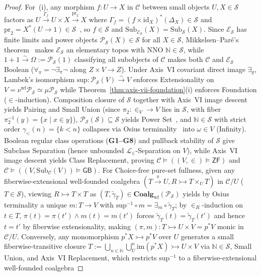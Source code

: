 \begin{proof}
For~(i), any morphism $f : U \to X$ in $\mathcal{C}$ between small objects $U, X \in \mathcal{S}$ factors as $U \xrightarrow{\Gamma_f} U \times X \xrightarrow{\mathrm{pr}_2} X$ where $\Gamma_f = (f \times \mathrm{id}_X)^*(\Delta_X) \in \mathcal{S}$ and $\mathrm{pr}_2 = X^*(U \to 1) \in \mathcal{S}$~\cite[Lemma~I.1.2]{JoyalMoerdijk95}, so $f \in \mathcal{S}$ and $\mathrm{Sub}_{\mathcal{E}_{\mathcal{S}}}(X) = \mathrm{Sub}_{\mathcal{S}}(X)$. Since $\mathcal{E}_{\mathcal{S}}$ has finite limits and power objects $\mathcal{P}_{\mathcal{S}}(X) \in \mathcal{S}$ for all $X \in \mathcal{S}$, Mikkelsen--Par\'e's theorem~\cite[Thm.~A2.2.3 \& Cor.~A2.2.4]{Johnstone02} makes $\mathcal{E}_{\mathcal{S}}$ an elementary topos with $\mathrm{NNO}$ $\mathbb{N} \in \mathcal{S}$, while $1 + 1 \xrightarrow{\sim} \Omega := \mathcal{P}_{\mathcal{S}}(1)$ classifying all subobjects of $\mathcal{C}$ makes both $\mathcal{C}$ and $\mathcal{E}_{\mathcal{S}}$ Boolean ($\forall_\pi = \neg\exists_\pi\neg$ along $Z \times V \to Z$). Under Axis~VI covariant direct image $\exists_g$, Lambek's isomorphism $\mathrm{sup} : \mathcal{P}_{\mathcal{S}}(V) \xrightarrow{\sim} V$ enforces Extensionality on $V = \nu^{\mathrm{wf}}\mathcal{P}_{\mathcal{S}} \simeq \mu\mathcal{P}_{\mathcal{S}}$ while Theorem~\ref{thm:axis-vii-foundation}(i) enforces Foundation ($\in$-induction). Composition closure of $\mathcal{S}$ together with Axis~VI image descent yields Pairing and Small Union (since $\pi_2 : \in_V \to V$ lies in $\mathcal{S}$, with fiber $\pi_2^{-1}(y) = \{x \mid x \in y\}$), $\mathcal{P}_{\mathcal{S}}(\mathcal{S}) \subseteq \mathcal{S}$ yields Power Set~\cite[Thm.~I.2.1]{JoyalMoerdijk95}, and $\mathbb{N} \in \mathcal{S}$ with strict order $\gamma_<(n) = \{k < n\}$ collapses via Osius terminality~\cite{Osius74} into $\omega \in V$ (Infinity). Boolean regular class operations (\textbf{G1--G8}) and pullback stability of $\mathcal{S}$ give Subclass Separation (hence unbounded $\mathcal{L}_\in$-Separation on $V$), while Axis~VI image descent yields Class Replacement, proving $\mathcal{C} \models ((V, \in) \models \mathsf{ZF})$ and $\mathcal{C} \models ((V, \mathrm{Sub}_{\mathcal{C}}(V)) \models \mathsf{GB})$. For Choice-free pure-set fullness, given any fiberwise-extensional well-founded coalgebra $(T \xrightarrow{\pi} U, R \rightarrowtail T \times_U T)$ in $\mathcal{C}/U$ ($T \in \mathcal{S}$), viewing $R \rightarrowtail T \times T$ as $(T, \tilde{\gamma}_T) \in \mathbf{Coalg}_{\mathrm{wf}}(\mathcal{P}_{\mathcal{S}})$ yields by Osius terminality a unique $m : T \to V$ with $\mathrm{sup}^{-1} \circ m = \exists_m \circ \tilde{\gamma}_T$; by $\in_R$-induction on $t \in T$, $\pi(t) = \pi(t') \wedge m(t) = m(t')$ forces $\tilde{\gamma}_T(t) = \tilde{\gamma}_T(t')$ and hence $t = t'$ by fiberwise extensionality, making $(\pi, m) : T \rightarrowtail U \times V = p^* V$ monic in $\mathcal{C}/U$. Conversely, any monomorphism $p^* X \rightarrowtail p^* V$ over $U$ generates a small fiberwise-transitive closure $T := \bigcup_{n \in \mathbb{N}} \bigcup^n_U \mathrm{im}(p^* X) \rightarrowtail U \times V$ via $\mathbb{N} \in \mathcal{S}$, Small Union, and Axis~VI Replacement, which restricts $\mathrm{sup}^{-1}$ to a fiberwise-extensional well-founded coalgebra 
\end{proof}
